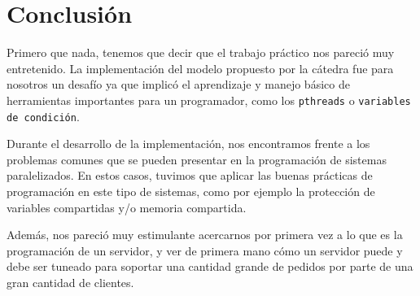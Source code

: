 \documentclass[11pt, a4paper, twoside]{article}
\begin{document}



\newpage
{}
\section{Conclusión}


Primero que nada, tenemos que decir que el trabajo práctico nos pareció muy entretenido. La implementación del modelo propuesto por la cátedra fue para nosotros un desafío ya que implicó el aprendizaje y manejo básico de herramientas importantes para un programador, como los \texttt{pthreads} o \texttt{variables de condición}.

Durante el desarrollo de la implementación, nos encontramos frente a los problemas comunes que se pueden
presentar en la programación de sistemas paralelizados. En estos casos, tuvimos que aplicar las buenas prácticas de programación en este tipo de sistemas, como por ejemplo la protección de variables compartidas y/o memoria compartida.

Además, nos pareció muy estimulante acercarnos por primera vez a lo que es la programación de un servidor, y ver
de primera mano cómo un servidor puede y debe ser tuneado para soportar una cantidad grande de pedidos por parte de una gran cantidad de clientes.
\end{document}
